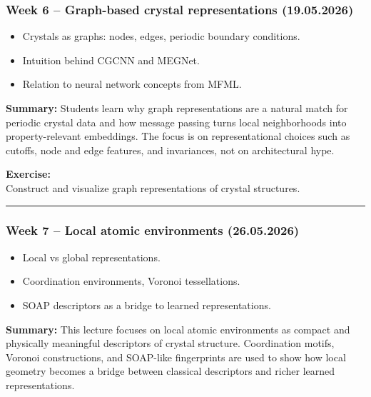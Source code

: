 \documentclass[
]{agujournal2019}
\providecommand{\tightlist}{%
  \setlength{\itemsep}{0pt}\setlength{\parskip}{0pt}}
\begin{document}
\subsubsection{Week 6 -- Graph-based crystal representations
(19.05.2026)}\label{week-6-graph-based-crystal-representations-19.05.2026}

\begin{itemize}
\tightlist
\item
  Crystals as graphs: nodes, edges, periodic boundary conditions.
\item
  Intuition behind CGCNN and MEGNet.
\item
  Relation to neural network concepts from MFML.
\end{itemize}

\textbf{Summary:} Students learn why graph representations are a natural
match for periodic crystal data and how message passing turns local
neighborhoods into property-relevant embeddings. The focus is on
representational choices such as cutoffs, node and edge features, and
invariances, not on architectural hype.

\textbf{Exercise:}\\
Construct and visualize graph representations of crystal structures.

\begin{center}\rule{0.5\linewidth}{0.5pt}\end{center}

\subsubsection{Week 7 -- Local atomic environments
(26.05.2026)}\label{week-7-local-atomic-environments-26.05.2026}

\begin{itemize}
\tightlist
\item
  Local vs global representations.
\item
  Coordination environments, Voronoi tessellations.
\item
  SOAP descriptors as a bridge to learned representations.
\end{itemize}

\textbf{Summary:} This lecture focuses on local atomic environments as
compact and physically meaningful descriptors of crystal structure.
Coordination motifs, Voronoi constructions, and SOAP-like fingerprints
are used to show how local geometry becomes a bridge between classical
descriptors and richer learned representations.
\end{document}
